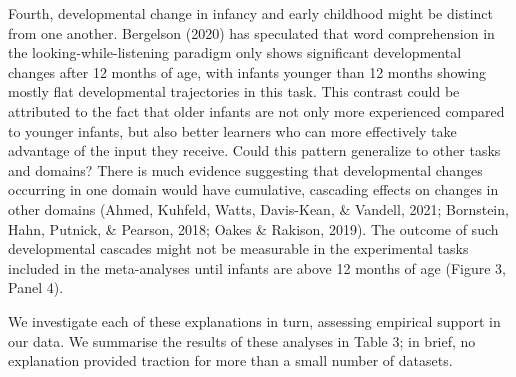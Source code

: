 \documentclass[
  man]{apa6}
\begin{document}
Fourth, developmental change in infancy and early childhood might be distinct from one another. Bergelson (2020) has speculated that word comprehension in the looking-while-listening paradigm only shows significant developmental changes after 12 months of age, with infants younger than 12 months showing mostly flat developmental trajectories in this task. This contrast could be attributed to the fact that older infants are not only more experienced compared to younger infants, but also better learners who can more effectively take advantage of the input they receive. Could this pattern generalize to other tasks and domains? There is much evidence suggesting that developmental changes occurring in one domain would have cumulative, cascading effects on changes in other domains (Ahmed, Kuhfeld, Watts, Davis-Kean, \& Vandell, 2021; Bornstein, Hahn, Putnick, \& Pearson, 2018; Oakes \& Rakison, 2019). The outcome of such developmental cascades might not be measurable in the experimental tasks included in the meta-analyses until infants are above 12 months of age (Figure 3, Panel 4).

We investigate each of these explanations in turn, assessing empirical support in our data. We summarise the results of these analyses in Table 3; in brief, no explanation provided traction for more than a small number of datasets.

\def\checkmark{\tikz\fill[scale=0.4](0,.35) -- (.25,0) -- (1,.7) -- (.25,.15) -- cycle;}
\end{document}
